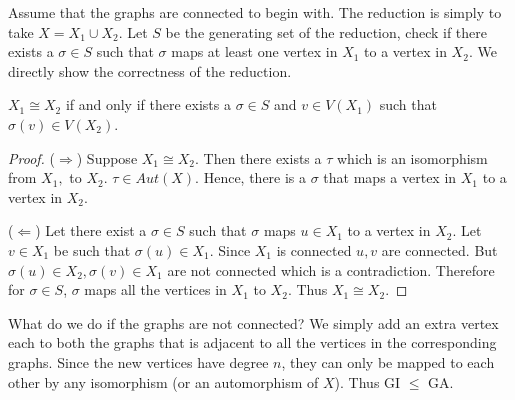 Assume that the graphs are connected to begin with. The reduction is simply to take $X = X_1 \cup X_2$. Let $S$ be the generating set of the reduction, check if there exists a $\sigma \in S$ such that $\sigma$ maps at least one vertex in $X_1$ to a vertex in $X_2$. We directly show the correctness of the reduction.

\begin{claim}
$X_1 \cong X_2$ if and only if there exists a $\sigma \in S$ and $v \in V(X_1)$ such that $\sigma(v) \in V(X_2)$.
\end{claim}
\begin{proof}
($\Rightarrow$) Suppose $X_1 \cong X_2$. Then there exists a $\tau$ which is an isomorphism from $X_1,$ to $X_2$. $\tau \in Aut(X)$. Hence, there is a $\sigma$ that maps a vertex in $X_1$ to a vertex in $X_2$.

($\Leftarrow$) Let there exist a $\sigma\in S$ such that $\sigma$ maps $u \in X_1$ to a vertex in $X_2$. Let $v \in X_1$ be such that $\sigma(u) \in X_1$. Since $X_1$ is connected $u,v$ are connected. But $\sigma(u) \in X_2, \sigma(v) \in X_1$ are not connected which is a contradiction. Therefore for $\sigma\in S$, $\sigma$ maps all the vertices in $X_1$ to $X_2$. Thus $X_1 \cong X_2$.
\end{proof}

What do we do if the graphs are not connected? We simply add an extra vertex each to both the graphs that is adjacent to all the vertices in the corresponding graphs. Since the new vertices have degree $n$, they can only be mapped to each other by any isomorphism (or an automorphism of $X$). Thus GI $\le$ GA.




